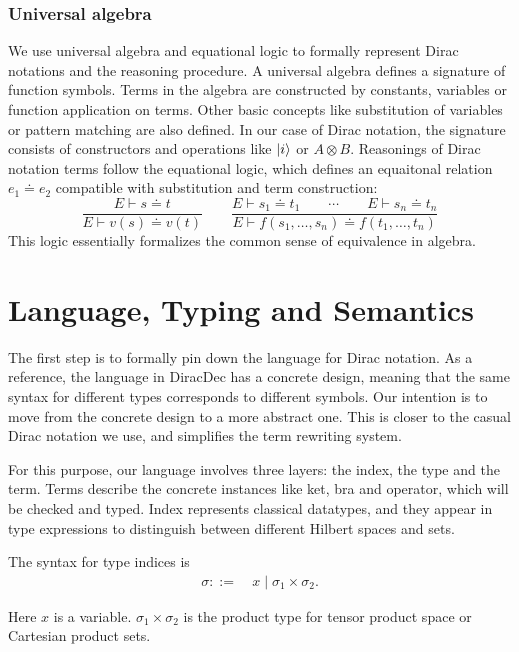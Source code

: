 \documentclass[runningheads]{llncs}
\begin{document}
\subsubsection{Universal algebra}
We use universal algebra and equational logic to formally represent Dirac notations and the reasoning procedure.
A universal algebra defines a signature of function symbols.
Terms in the algebra are constructed by constants, variables or function application on terms. 
Other basic concepts like substitution of variables or pattern matching are also defined.
In our case of Dirac notation, the signature consists of constructors and operations like $\ket{i}$ or $A \otimes B$.
Reasonings of Dirac notation terms follow the equational logic, which defines an equaitonal relation $e_1 \doteq e_2$ compatible with substitution and term construction:
\[
    \frac{E \vdash s \doteq t}{E \vdash v(s) \doteq v(t)}
    \qquad
    \frac{E \vdash s_1 \doteq t_1 \qquad \cdots \qquad E \vdash s_n \doteq t_n}{E \vdash f(s_1, \dots, s_n) \doteq f(t_1, \dots, t_n)}
\]
This logic essentially formalizes the common sense of equivalence in algebra.



\section{Language, Typing and Semantics}
The first step is to formally pin down the language for Dirac notation.
As a reference, the language in DiracDec has a concrete design, meaning that the same syntax for different types corresponds to different symbols.
Our intention is to move from the concrete design to a more abstract one. This is closer to the casual Dirac notation we use, and simplifies the term rewriting system.

For this purpose, our language involves three layers: the index, the type and the term.
Terms describe the concrete instances like ket, bra and operator, which will be checked and typed.
Index represents classical datatypes, and they appear in type expressions to distinguish between different Hilbert spaces and sets.

\begin{definition}
    The syntax for type indices is
    \begin{align*}
        \sigma ::=\ & x \mid \sigma_1 \times \sigma_2.
    \end{align*}
\end{definition}
Here $x$ is a variable. $\sigma_1 \times \sigma_2$ is the product type for tensor product space or Cartesian product sets.
\end{document}

